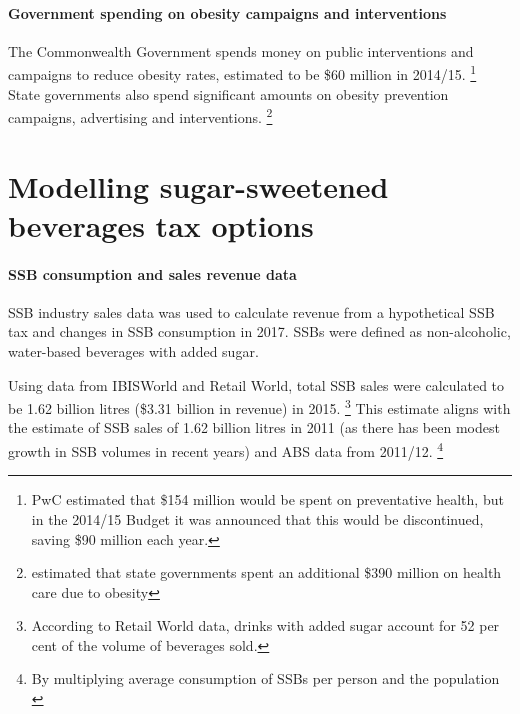 \documentclass[embargoed]{grattan}
\begin{document}
\subsubsection{Government spending on obesity campaigns and interventions}\label{government-spending-on-obesity-campaigns-and-interventions}

The Commonwealth Government spends money on public interventions and campaigns to reduce obesity rates, estimated to be \$60 million in 2014/15.%
\footnote{PwC estimated that \$154 million would be spent on preventative health, but in the 2014/15 Budget it was announced that this would be discontinued, saving \$90 million each year\textcites{PwC2015Weighingcostobesity}{Treasury2016201617BudgetBudget}.} State governments also spend significant amounts on obesity prevention campaigns, advertising and interventions.%
\footnote{\textcite{PwC2015Weighingcostobesity} estimated that state governments spent an additional \$390 million on health care due to obesity}

\chapter{Modelling sugar-sweetened beverages tax options}\label{appendix-3-modelling-sugar-sweetened-beverages-tax-options}

\subsubsection{SSB consumption and sales revenue data}\label{ssb-consumption-and-sales-revenue-data}

SSB industry sales data was used to calculate revenue from a hypothetical SSB tax and changes in SSB consumption in 2017.
SSBs were defined as non-alcoholic, water-based beverages with added sugar.

Using data from IBISWorld and Retail World, total SSB sales were calculated to be 1.62 billion litres (\$3.31 billion in revenue) in 2015.%
\footnote{\textcites{Media2015RetailWorldAnnual}{IBISWorld2016FruitJuiceDrink}{IBISWorld2016SoftDrinkManufacturing}
According to Retail World data, drinks with added sugar account for 52 per cent of the volume of beverages sold.} This estimate aligns with the \textcite{Levy2014QuenchingAustraliasthirst} estimate of SSB sales of 1.62 billion litres in 2011 (as there has been modest growth in SSB volumes in recent years) and ABS data from 2011/12.%
\footnote{By multiplying average consumption of SSBs per person and the population \textcite{ABS20144364055007AustralianHealth}}
\end{document}
